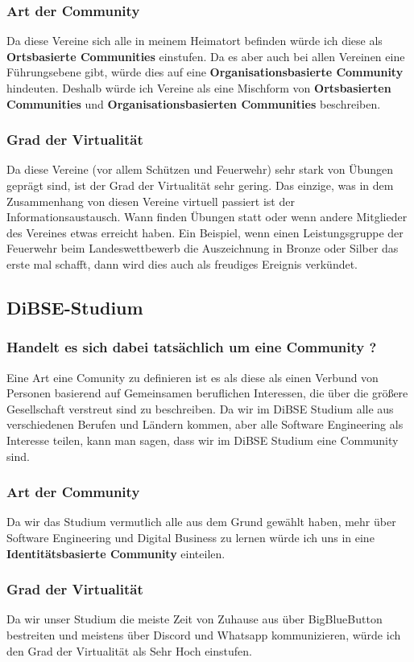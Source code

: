 \documentclass[12pt]{article}
\begin{document}
\subsubsection{Art der Community}
Da diese Vereine sich alle in meinem Heimatort befinden würde ich diese als \textbf{Ortsbasierte Communities} einstufen. Da es aber auch bei allen Vereinen eine Führungsebene gibt, würde dies auf eine \textbf{Organisationsbasierte Community} hindeuten. Deshalb würde ich Vereine als eine Mischform von \textbf{Ortsbasierten Communities} und  \textbf{Organisationsbasierten Communities} beschreiben.
\subsubsection{Grad der Virtualität}
Da diese Vereine (vor allem Schützen und Feuerwehr) sehr stark von Übungen geprägt sind, ist der Grad der Virtualität sehr gering. Das einzige, was in dem Zusammenhang von diesen Vereine virtuell passiert ist der Informationsaustausch. Wann finden Übungen statt oder wenn andere Mitglieder des Vereines etwas erreicht haben. Ein Beispiel, wenn einen Leistungsgruppe der Feuerwehr beim Landeswettbewerb die Auszeichnung in Bronze oder Silber das erste mal schafft, dann wird dies auch als freudiges Ereignis verkündet.
\pagebreak
\subsection{DiBSE-Studium}
\subsubsection{Handelt es sich dabei tatsächlich um eine Community ?}
Eine Art eine Comunity zu definieren ist es als diese als einen Verbund von Personen basierend auf Gemeinsamen beruflichen Interessen, die über die größere Gesellschaft verstreut sind zu beschreiben. Da wir im DiBSE Studium alle aus verschiedenen Berufen und Ländern kommen, aber alle Software Engineering als Interesse teilen, kann man sagen, dass wir im DiBSE Studium eine Community sind.
\subsubsection{Art der Community}
Da wir das Studium vermutlich alle aus dem Grund gewählt haben, mehr über Software Engineering und Digital Business zu lernen würde ich uns in eine \textbf{Identitätsbasierte Community} einteilen.
\subsubsection{Grad der Virtualität}
Da wir unser Studium die meiste Zeit von Zuhause aus über BigBlueButton bestreiten und meistens über Discord und Whatsapp kommunizieren, würde ich den Grad der Virtualität als Sehr Hoch einstufen.
\end{document}
